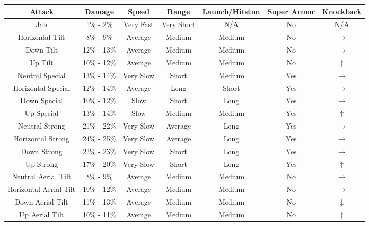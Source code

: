 \begin{table}[h!]
    \centering
    \begin{tabular}{| c | c | c | c | c | c | c |}
        \hline
        \textbf{Attack} & \textbf{Damage} & \textbf{Speed} & \textbf{Range} & \textbf{Launch/Hitstun} & \textbf{Super Armor} & \textbf{Knockback} \\
        \hline
        Jab & 1\% - 2\% & Very Fast & Very Short & N/A & No & N/A \\
        \hline
        Horizontal Tilt & 8\% - 9\% & Average & Medium & Medium & No & $\rightarrow$ \\
        \hline
        Down Tilt & 12\% - 13\% & Average & Medium & Medium & No & $\rightarrow$ \\
        \hline
        Up Tilt & 10\% - 12\% & Average & Medium & Medium & No & $\uparrow$ \\
        \hline
        Neutral Special & 13\% - 14\% & Very Slow & Short & Medium & Yes & $\rightarrow$ \\
        \hline
        Horizontal Special & 12\% - 14\% & Average & Long & Short & Yes & $\rightarrow$ \\
        \hline
        Down Special & 10\% - 12\% & Slow & Short & Long & Yes & $\rightarrow$ \\
        \hline
        Up Special & 13\% - 14\% & Slow & Medium & Medium & Yes & $\uparrow$ \\
        \hline
        Neutral Strong & 21\% - 22\% & Very Slow & Average & Long & Yes & $\rightarrow$ \\
        \hline
        Horizontal Strong & 24\% - 25\% & Very Slow & Average & Long & Yes & $\rightarrow$ \\
        \hline
        Down Strong & 22\% - 23\% & Very Slow & Short & Long & Yes & $\rightarrow$ \\
        \hline
        Up Strong & 17\% - 20\% & Very Slow & Short & Long & Yes & $\uparrow$ \\
        \hline
        Neutral Aerial Tilt & 8\% - 9\% & Average & Medium & Medium & No & $\rightarrow$ \\
        \hline
        Horizontal Aerial Tilt & 10\% - 12\% & Average & Medium & Medium & No & $\rightarrow$ \\
        \hline
        Down Aerial Tilt & 11\% - 13\% & Average & Medium & Medium & No & $\downarrow$ \\
        \hline
        Up Aerial Tilt & 10\% - 11\% & Average & Medium & Medium & No & $\uparrow$ \\

\end{tabular}
\end{table}
